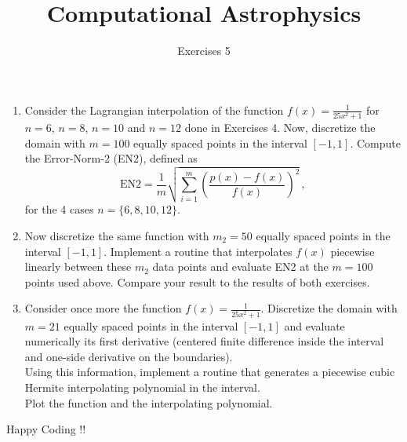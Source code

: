 \documentclass[10pt,letterpaper,notitlepage]{report}
\begin{document}
\title{Computational Astrophysics}
\author{Exercises 5 }
\maketitle

\begin{enumerate}

\item Consider the Lagrangian interpolation of the function  $f(x) = \frac{1}{25 x^2 + 1}$ for $n=6$, $n=8$, $n=10$ and $n=12$ 
done in Exercises 4. Now, discretize the domain with $m=100$ equally spaced points in the interval
  $[-1,1]$. Compute the Error-Norm-2 (EN2), defined as
  \begin{equation*}
    \text{EN2} = \frac{1}{m} \sqrt{ \sum_{i=1}^m 
      \left(\frac{p(x)-f(x)}{f(x)}\right)  ^2 }\,,
  \end{equation*}
 for the 4 cases $n=\{6,8,10,12\}$.

\item Now discretize the same function with $m_2 = 50$ equally spaced points in the interval
  $[-1,1]$. Implement a routine that interpolates $f(x)$ piecewise
  linearly between these $m_2$ data points  and evaluate EN2
  at the $m= 100$ points used above. Compare your result to the
  results of both exercises.
  
  \item Consider once more the function  $f(x) = \frac{1}{25 x^2 + 1}$. Discretize the domain with $m=21$ equally spaced points in the interval $[-1,1]$ and evaluate numerically its first derivative (centered finite difference inside the interval and one-side derivative on the boundaries). \\
Using this information, implement a routine that generates a piecewise cubic Hermite interpolating
polynomial in the interval. \\
Plot the function and the interpolating polynomial.  
\end{enumerate}

Happy Coding !!
\end{document}

